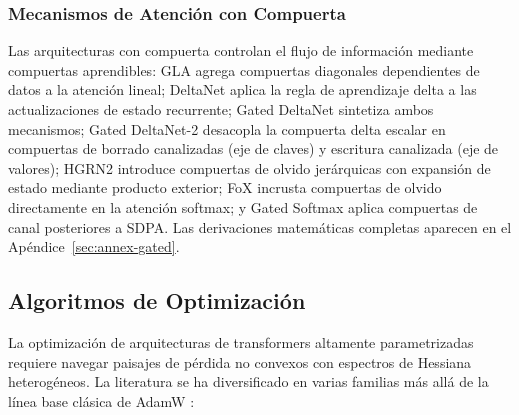 \documentclass[11pt,a4paper]{article}
\begin{document}
\subsubsection{Mecanismos de Atención con Compuerta}
Las arquitecturas con compuerta controlan el flujo de información mediante compuertas aprendibles: GLA \citep{yang_gla_2023} agrega compuertas diagonales dependientes de datos a la atención lineal; DeltaNet \citep{yang_deltanet_2024} aplica la regla de aprendizaje delta a las actualizaciones de estado recurrente; Gated DeltaNet \citep{yang_gated_deltanet_2024} sintetiza ambos mecanismos; Gated DeltaNet-2 \citep{hatamizadeh_gated_deltanet2_2026} desacopla la compuerta delta escalar en compuertas de borrado canalizadas (eje de claves) y escritura canalizada (eje de valores); HGRN2 \citep{qin_hgrn2_2024} introduce compuertas de olvido jerárquicas con expansión de estado mediante producto exterior; FoX \citep{lin_forgetting_transformer_2025} incrusta compuertas de olvido directamente en la atención softmax; y Gated Softmax \citep{qiu_gated_attention_2025} aplica compuertas de canal posteriores a SDPA. Las derivaciones matemáticas completas aparecen en el Apéndice~\ref{sec:annex-gated}.

\subsection{Algoritmos de Optimización}

La optimización de arquitecturas de transformers altamente parametrizadas requiere navegar paisajes de pérdida no convexos con espectros de Hessiana heterogéneos. La literatura se ha diversificado en varias familias más allá de la línea base clásica de AdamW \citep{loshchilov_decoupled_2017}:
\end{document}
